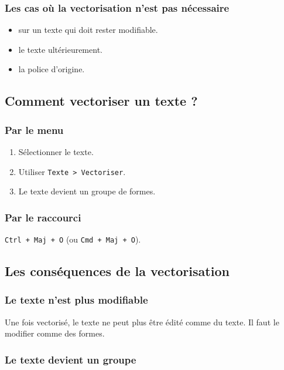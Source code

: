 \subsubsection{Les cas où la vectorisation n'est pas nécessaire}

\begin{itemize}
    \item {} sur un texte qui doit rester modifiable.
    \item {} le texte ultérieurement.
    \item {} la police d'origine.
\end{itemize}

\subsection{Comment vectoriser un texte ?}

\subsubsection{Par le menu}

\begin{enumerate}
    \item Sélectionner le texte.
    \item Utiliser \texttt{Texte > Vectoriser}.
    \item Le texte devient un groupe de formes.
\end{enumerate}

\subsubsection{Par le raccourci}

\texttt{Ctrl + Maj + O} (ou \texttt{Cmd + Maj + O}).

\subsection{Les conséquences de la vectorisation}

\subsubsection{Le texte n'est plus modifiable}

Une fois vectorisé, le texte ne peut plus être édité comme du texte. Il faut le modifier comme des formes.

\subsubsection{Le texte devient un groupe}

